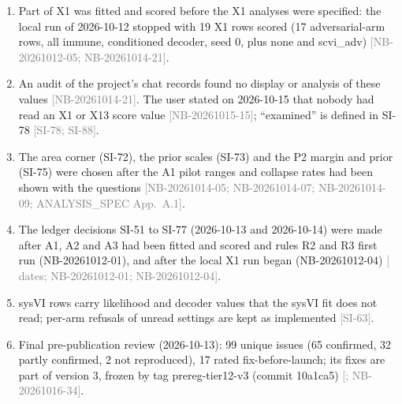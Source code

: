 \documentclass[11pt]{article}
\newcommand{\src}[1]{{\scriptsize\textcolor{gray}{[#1]}}}
\begin{document}
\begin{enumerate}
\item Part of X1 was fitted and scored before the X1 analyses were specified: the local run of 2026-10-12 stopped with 19 X1 rows scored (17 adversarial-arm rows, all immune, conditioned decoder, seed 0, plus none and scvi\_adv) \src{NB-20261012-05; NB-20261014-21}.
\item An audit of the project's chat records found no display or analysis of these values \src{NB-20261014-21}. The user stated on 2026-10-15 that nobody had read an X1 or X13 score value \src{NB-20261015-15}; ``examined'' is defined in SI-78 \src{SI-78; SI-88}.
\item The area corner (SI-72), the prior scales (SI-73) and the P2 margin and prior (SI-75) were chosen after the A1 pilot ranges and collapse rates had been shown with the questions \src{NB-20261014-05; NB-20261014-07; NB-20261014-09; ANALYSIS\_SPEC App.~A.1}.
\item The ledger decisions SI-51 to SI-77 (2026-10-13 and 2026-10-14) were made after A1, A2 and A3 had been fitted and scored and rules R2 and R3 first run (NB-20261012-01), and after the local X1 run began (NB-20261012-04) \src{ dates; NB-20261012-01; NB-20261012-04}.
\item sysVI rows carry likelihood and decoder values that the sysVI fit does not read; per-arm refusals of unread settings are kept as implemented \src{SI-63}.
\item Final pre-publication review (2026-10-13): 99 unique issues (65 confirmed, 32 partly confirmed, 2 not reproduced), 17 rated fix-before-launch; its fixes are part of version 3, frozen by tag prereg-tier12-v3 (commit 10a1ca5) \src{; NB-20261016-34}.
\end{enumerate}
\end{document}
